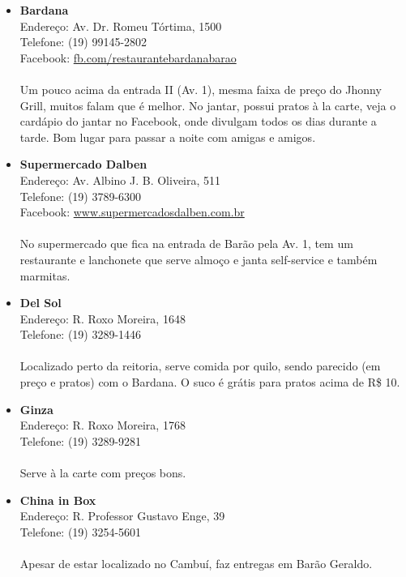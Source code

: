 \begin{itemize}
\item \textbf{Bardana}
  \\Endereço: Av. Dr. Romeu Tórtima, 1500
  \\Telefone: (19) 99145-2802
  \\Facebook: \url{fb.com/restaurantebardanabarao}
  \\
  \\Um pouco acima da entrada II (Av. 1), mesma faixa de preço do Jhonny Grill,
  muitos falam que é melhor. No jantar, possui pratos à la carte, veja o
  cardápio do jantar no Facebook, onde divulgam todos os dias durante a tarde.
  Bom lugar para passar a noite com amigas e amigos.

\item \textbf{Supermercado Dalben}
  \\Endereço: Av. Albino J. B. Oliveira, 511
  \\Telefone: (19) 3789-6300
  \\Facebook: \url{www.supermercadosdalben.com.br}
  \\
  \\No supermercado que fica na entrada de Barão pela Av. 1, tem um restaurante
  e lanchonete que serve almoço e janta self-service e também marmitas.

\item \textbf{Del Sol}
  \\Endereço: R. Roxo Moreira, 1648
  \\Telefone: (19) 3289-1446
  \\
  \\Localizado perto da reitoria, serve comida por quilo, sendo parecido (em
  preço e pratos) com o Bardana. O suco é grátis para pratos acima de R\$ 10.

\item \textbf{Ginza}
  \\Endereço: R. Roxo Moreira, 1768
  \\Telefone: (19) 3289-9281
  \\
  \\Serve à la carte com preços bons.

\item \textbf{China in Box}
  \\Endereço: R. Professor Gustavo Enge, 39
  \\Telefone: (19) 3254-5601
  \\
  \\Apesar de estar localizado no Cambuí, faz entregas em Barão Geraldo.


\end{itemize}
